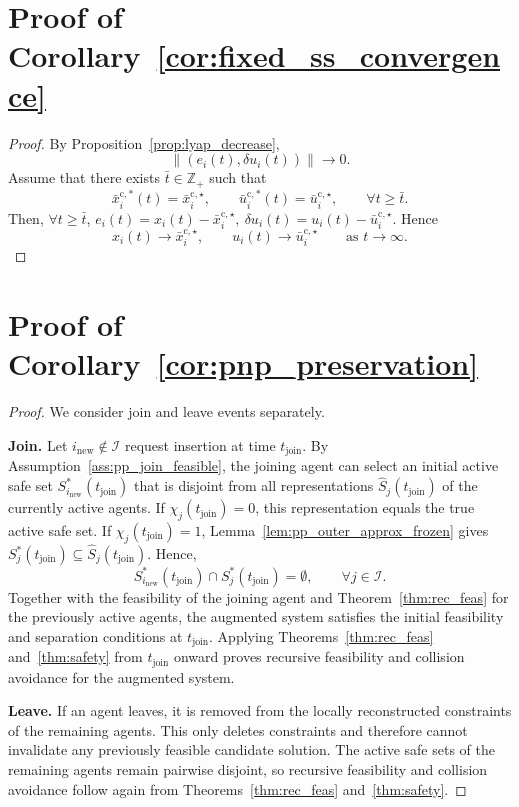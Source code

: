 \documentclass[twocolumn]{autart}
\begin{document}
\section{Proof of Corollary~\ref{cor:fixed_ss_convergence}}

\begin{proof}
By Proposition~\ref{prop:lyap_decrease},
\[
\|(e_i(t),\delta u_i(t))\|\to 0.
\]
Assume that there exists $\bar t\in\mathbb Z_+$ such that
\[
\bar x_i^{\mathrm c,\ast}(t)=\bar x_i^{\mathrm c,\star},
\qquad
\bar u_i^{\mathrm c,\ast}(t)=\bar u_i^{\mathrm c,\star},
\qquad \forall t\ge \bar t.
\]
Then, $\forall t\ge \bar t$,
\(
e_i(t)=x_i(t)-\bar x_i^{\mathrm c,\star},
\
\delta u_i(t)=u_i(t)-\bar u_i^{\mathrm c,\star}.
\)
Hence
\[
x_i(t)\to \bar x_i^{\mathrm c,\star},
\qquad
u_i(t)\to \bar u_i^{\mathrm c,\star}
\qquad\text{as } t\to\infty.
\]
\end{proof}
\section{Proof of Corollary~\ref{cor:pnp_preservation}}

\begin{proof}
We consider join and leave events separately.

\smallskip
\noindent\textbf{Join.}
Let \(i_{\mathrm{new}}\notin\mathcal I\) request insertion at time
\(t_{\mathrm{join}}\). By Assumption~\ref{ass:pp_join_feasible}, the joining
agent can select an initial active safe set
\(S_{i_{\mathrm{new}}}^\ast(t_{\mathrm{join}})\) that is disjoint from all
representations \(\hat S_j(t_{\mathrm{join}})\) of the currently active
agents. If \(\chi_j(t_{\mathrm{join}})=0\), this representation equals the
true active safe set. If \(\chi_j(t_{\mathrm{join}})=1\),
Lemma~\ref{lem:pp_outer_approx_frozen} gives
\(S_j^\ast(t_{\mathrm{join}})\subseteq \hat S_j(t_{\mathrm{join}})\).
Hence,
\[
S_{i_{\mathrm{new}}}^\ast(t_{\mathrm{join}})
\cap
S_j^\ast(t_{\mathrm{join}})
=
\emptyset,
\qquad \forall j\in\mathcal I .
\]
Together with the feasibility of the joining agent and Theorem~\ref{thm:rec_feas}
for the previously active agents, the augmented system satisfies the
initial feasibility and separation conditions at \(t_{\mathrm{join}}\).
Applying Theorems~\ref{thm:rec_feas} and~\ref{thm:safety} from
\(t_{\mathrm{join}}\) onward proves recursive feasibility and collision
avoidance for the augmented system.

\smallskip
\noindent\textbf{Leave.}
If an agent leaves, it is removed from the locally reconstructed
constraints of the remaining agents. This only deletes constraints and
therefore cannot invalidate any previously feasible candidate solution.
The active safe sets of the remaining agents remain pairwise disjoint,
so recursive feasibility and collision avoidance follow again from
Theorems~\ref{thm:rec_feas} and~\ref{thm:safety}.
\end{proof}



\end{document}
